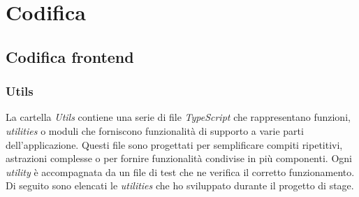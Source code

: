 \chapter{Codifica}\label{cap:codifica}


\section{Codifica frontend}\label{sec:codifica-front-end}

\subsection{Utils}\label{subsec:utils}
La cartella \textit{Utils} contiene una serie di file \textit{TypeScript} che rappresentano funzioni, \textit{utilities} o moduli che forniscono funzionalità di supporto a varie parti dell'applicazione.
Questi file sono progettati per semplificare compiti ripetitivi, astrazioni complesse o per fornire funzionalità condivise in più componenti. Ogni \textit{utility} è accompagnata 
da un file di test che ne verifica il corretto funzionamento.\\
Di seguito sono elencati le \textit{utilities} che ho sviluppato durante il progetto di stage.

